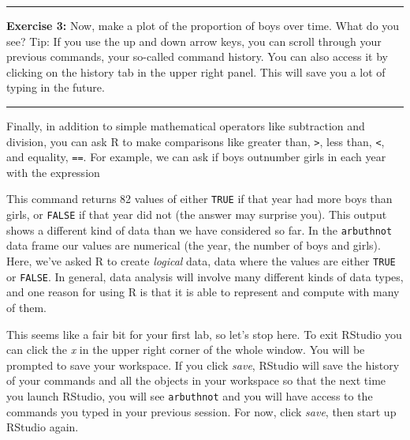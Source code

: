 \documentclass[]{book}
\newenvironment{Shaded}{\begin{snugshade}}{\end{snugshade}}
\newcommand{\StringTok}[1]{\textcolor[rgb]{0.31,0.60,0.02}{#1}}
\newcommand{\OperatorTok}[1]{\textcolor[rgb]{0.81,0.36,0.00}{\textbf{#1}}}
\newcommand{\NormalTok}[1]{#1}
\theoremstyle{definition}
\theoremstyle{definition}
\theoremstyle{definition}
\theoremstyle{remark}
\begin{document}
\begin{center}\rule{0.5\linewidth}{\linethickness}\end{center}

\textbf{Exercise 3:} Now, make a plot of the proportion of boys over
time. What do you see? Tip: If you use the up and down arrow keys, you
can scroll through your previous commands, your so-called command
history. You can also access it by clicking on the history tab in the
upper right panel. This will save you a lot of typing in the future.

\begin{center}\rule{0.5\linewidth}{\linethickness}\end{center}

Finally, in addition to simple mathematical operators like subtraction
and division, you can ask R to make comparisons like greater than,
\texttt{\textgreater{}}, less than, \texttt{\textless{}}, and equality,
\texttt{==}. For example, we can ask if boys outnumber girls in each
year with the expression

\begin{Shaded}
\end{Shaded}

This command returns 82 values of either \texttt{TRUE} if that year had
more boys than girls, or \texttt{FALSE} if that year did not (the answer
may surprise you). This output shows a different kind of data than we
have considered so far. In the \texttt{arbuthnot} data frame our values
are numerical (the year, the number of boys and girls). Here, we've
asked R to create \emph{logical} data, data where the values are either
\texttt{TRUE} or \texttt{FALSE}. In general, data analysis will involve
many different kinds of data types, and one reason for using R is that
it is able to represent and compute with many of them.

This seems like a fair bit for your first lab, so let's stop here. To
exit RStudio you can click the \emph{x} in the upper right corner of the
whole window. You will be prompted to save your workspace. If you click
\emph{save}, RStudio will save the history of your commands and all the
objects in your workspace so that the next time you launch RStudio, you
will see \texttt{arbuthnot} and you will have access to the commands you
typed in your previous session. For now, click \emph{save}, then start
up RStudio again.
\end{document}
